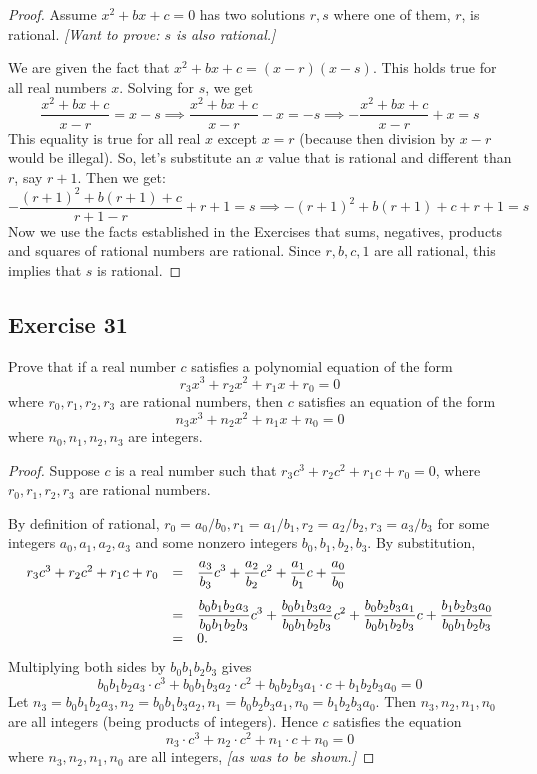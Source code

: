 \documentclass[14pt]{extarticle}
\newcommand{\dps}{\displaystyle}
\begin{document}
\begin{proof}
    Assume $x^2 + bx + c = 0$ has two solutions $r,s$ where one of them, $r$, is rational. {\it [Want to prove: $s$ is also rational.]}

    We are given the fact that $x^2 + bx + c = (x - r)(x - s)$. This holds true for all real numbers $x$. Solving for $s$, we get
    \[
        \frac{x^2 + bx + c}{x-r} = x - s \implies \frac{x^2 + bx + c}{x-r} -x = - s \implies -\frac{x^2 + bx + c}{x-r} + x = s
    \]
    This equality is true for all real $x$ except $x = r$ (because then division by $x-r$ would be illegal). So, let's substitute an $x$ value that is rational and different than $r$, say $r+1$. Then we get:
    \[
        -\frac{(r+1)^2 + b(r+1) + c}{r+1-r} + r+1 = s \implies -(r+1)^2 + b(r+1) + c + r+1 = s
    \]
    Now we use the facts established in the Exercises that sums, negatives, products and squares of rational numbers are rational. Since $r, b, c, 1$ are all rational, this implies that $s$ is rational.
\end{proof}

\subsection{Exercise 31}
Prove that if a real number $c$ satisfies a polynomial equation of the form
\[
    r_3 x^3 + r_2 x^2 + r_1 x + r_0 = 0
\]
where $r_0, r_1, r_2, r_3$ are rational numbers, then $c$ satisfies an equation of the form
\[
    n_3 x^3 + n_2 x^2 + n_1 x + n_0 = 0
\]
where $n_0, n_1, n_2, n_3$ are integers.

\begin{proof}
    Suppose $c$ is a real number such that $r_3 c^3 + r_2 c^2 + r_1 c + r_0 = 0$, where $r_0, r_1, r_2, r_3$ are rational numbers.

    By definition of rational, $r_0 = a_0/b_0, r_1 = a_1/b_1, r_2 = a_2/b_2, r_3 = a_3/b_3$ for some integers $a_0, a_1, a_2, a_3$ and some nonzero integers $b_0, b_1, b_2, b_3$. By substitution,
    \[
        \begin{array}{rcl}
            r_3 c^3 + r_2 c^2 + r_1 c + r_0 & = & \dps\frac{a_3}{b_3}c^3 + \frac{a_2}{b_2}c^2 + \frac{a_1}{b_1}c + \frac{a_0}{b_0} \vspace{0.3cm}                                                          \\
                                            & = & \dps\frac{b_0b_1b_2a_3}{b_0b_1b_2b_3}c^3 + \frac{b_0b_1b_3a_2}{b_0b_1b_2b_3}c^2 + \frac{b_0b_2b_3a_1}{b_0b_1b_2b_3}c + \frac{b_1b_2b_3a_0}{b_0b_1b_2b_3} \\
                                            & = & 0.
        \end{array}
    \]
    Multiplying both sides by $b_0b_1b_2b_3$ gives
    \[
        b_0b_1b_2a_3 \cdot c^3 + b_0b_1b_3a_2 \cdot c^2 + b_0b_2b_3a_1 \cdot c + b_1b_2b_3a_0 = 0
    \]
    Let $n_3 = b_0b_1b_2a_3, n_2 = b_0b_1b_3a_2, n_1 = b_0b_2b_3a_1, n_0 = b_1b_2b_3a_0$. Then $n_3, n_2, n_1, n_0$ are all integers (being products of integers). Hence $c$ satisfies the equation
    \[
        n_3 \cdot c^3 + n_2 \cdot c^2 + n_1 \cdot c + n_0 = 0
    \]
    where $n_3, n_2, n_1, n_0$ are all integers, {\it [as was to be shown.]}
\end{proof}
\end{document}
